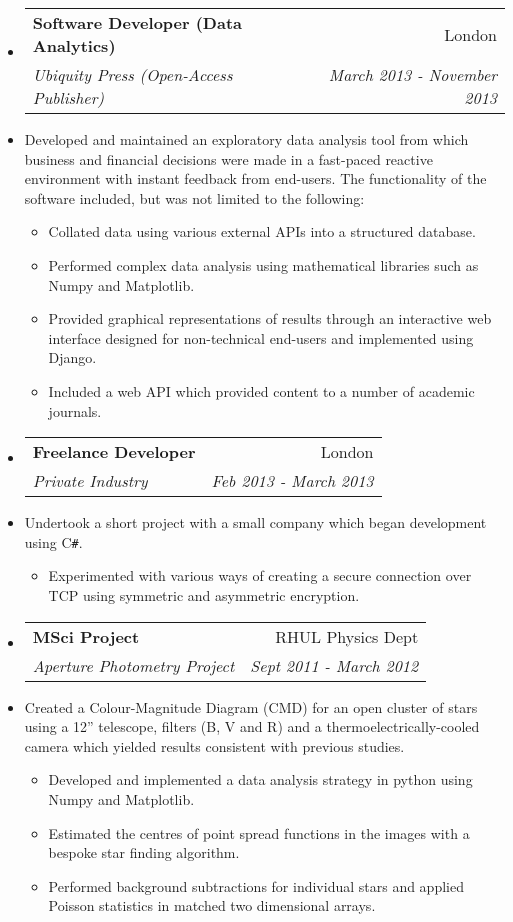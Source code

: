 \documentclass[letterpaper,11pt]{article}
\makeatletter
\newcommand{\resitem}[1]{\item #1 \vspace{-2pt}}
\newcommand{\ressubheading}[4]{
		\begin{tabular*}{180mm}{l@{\extracolsep{\fill}}r}
			\textbf{#1} & #2 \\
			\textit{#3} & \textit{#4} \\
		\end{tabular*}\vspace{-6pt}
	}
\newcommand{\resdescription}[1]{#1 \vspace{-0mm}}
\makeatother
\begin{document}
\begin{itemize}
		\item[]
			\ressubheading{Software Developer (Data Analytics)}{London}{Ubiquity Press (Open-Access Publisher)}{March 2013 - November 2013}
		\item[]
			\resdescription{Developed and maintained an exploratory data analysis tool from which business and financial decisions were made in a fast-paced reactive environment with instant feedback from end-users. The functionality of the software included, but was not limited to the following:}
			\begin{itemize}
					\resitem{Collated data using various external APIs into a structured database.}
					\resitem{Performed complex data analysis using mathematical libraries such as Numpy and Matplotlib.}
					\resitem{Provided graphical representations of results through an interactive web interface designed for non-technical end-users and implemented using Django.}
					\resitem{Included a web API which provided content to a number of academic journals.}
			\end{itemize}

		\item[]
			\ressubheading{Freelance Developer}{London}{Private Industry}{Feb 2013 - March 2013}
		\item[]
			\resdescription{Undertook a short project with a small company which began development using C\texttt{\#}.}
			\begin{itemize}
					\resitem{Experimented with various ways of creating a secure connection over TCP using symmetric and asymmetric encryption.}
			\end{itemize}

		\item[]
			\ressubheading{MSci Project}{RHUL Physics Dept}{Aperture Photometry Project}{Sept 2011 - March 2012}
		\item[]
			\resdescription{Created a Colour-Magnitude Diagram (CMD) for an open cluster of stars using a 12'' telescope, filters (B, V and R) and a thermoelectrically-cooled camera which yielded results consistent with previous studies.}
			\begin{itemize}
					\resitem{Developed and implemented a data analysis strategy in python using Numpy and Matplotlib.}
					\resitem{Estimated the centres of point spread functions in the images with a bespoke star finding algorithm.}
					\resitem{Performed background subtractions for individual stars and applied Poisson statistics in matched two dimensional arrays.}
			\end{itemize}


\end{itemize}
\end{document}
